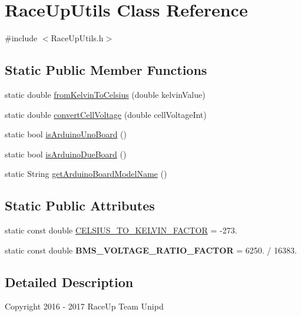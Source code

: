 \hypertarget{class_race_up_utils}{}\section{Race\+Up\+Utils Class Reference}
\label{class_race_up_utils}


{\ttfamily \#include $<$Race\+Up\+Utils.\+h$>$}

\subsection*{Static Public Member Functions}
\begin{DoxyCompactItemize}
\item 
static double \hyperlink{class_race_up_utils_ac40afe767e8d781d06effb03e9de8971}{from\+Kelvin\+To\+Celsius} (double kelvin\+Value)
\item 
static double \hyperlink{class_race_up_utils_ad57a448fb6131a2a38b0c3a8c967ee58}{convert\+Cell\+Voltage} (double cell\+Voltage\+Int)
\item 
static bool \hyperlink{class_race_up_utils_a0cc09fd89b708aed73b075b34b646e9a}{is\+Arduino\+Uno\+Board} ()
\item 
static bool \hyperlink{class_race_up_utils_a2625dadfdc9f45584c71a8872a7058d7}{is\+Arduino\+Due\+Board} ()
\item 
static String \hyperlink{class_race_up_utils_a331fe79dbe61bd7cd84a61b9a05c72e4}{get\+Arduino\+Board\+Model\+Name} ()
\end{DoxyCompactItemize}
\subsection*{Static Public Attributes}
\begin{DoxyCompactItemize}
\item 
static const double \hyperlink{class_race_up_utils_aa0db44e06e075ffd8693cc222f3becfb}{C\+E\+L\+S\+I\+U\+S\+\_\+\+T\+O\+\_\+\+K\+E\+L\+V\+I\+N\+\_\+\+F\+A\+C\+T\+OR} = -\/273.
\item 
static const double {\bfseries B\+M\+S\+\_\+\+V\+O\+L\+T\+A\+G\+E\+\_\+\+R\+A\+T\+I\+O\+\_\+\+F\+A\+C\+T\+OR} = 6250. / 16383.\hypertarget{class_race_up_utils_a0575a05c5b9f884dbaa445fad65a9ccd}{}\label{class_race_up_utils_a0575a05c5b9f884dbaa445fad65a9ccd}

\end{DoxyCompactItemize}


\subsection{Detailed Description}
Copyright 2016 -\/ 2017 Race\+Up Team Unipd

